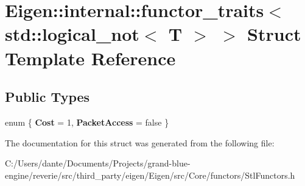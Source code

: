 \hypertarget{struct_eigen_1_1internal_1_1functor__traits_3_01std_1_1logical__not_3_01_t_01_4_01_4}{}\section{Eigen\+::internal\+::functor\+\_\+traits$<$ std\+::logical\+\_\+not$<$ T $>$ $>$ Struct Template Reference}
\label{struct_eigen_1_1internal_1_1functor__traits_3_01std_1_1logical__not_3_01_t_01_4_01_4}
\subsection*{Public Types}
\begin{DoxyCompactItemize}
\item 
\mbox{\label{struct_eigen_1_1internal_1_1functor__traits_3_01std_1_1logical__not_3_01_t_01_4_01_4_a56c85f8d2c2757eac88fc111988c8df1}} 
enum \{ {\bfseries Cost} = 1, 
{\bfseries Packet\+Access} = false
 \}
\end{DoxyCompactItemize}


The documentation for this struct was generated from the following file\+:\begin{DoxyCompactItemize}
\item 
C\+:/\+Users/dante/\+Documents/\+Projects/grand-\/blue-\/engine/reverie/src/third\+\_\+party/eigen/\+Eigen/src/\+Core/functors/Stl\+Functors.\+h\end{DoxyCompactItemize}
